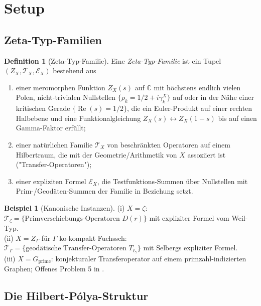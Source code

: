 \documentclass[11pt]{article}
\theoremstyle{definition}
\newtheorem{definition}[theorem]{Definition}
\newtheorem{example}[theorem]{Beispiel}
\theoremstyle{remark}
\renewcommand{\Re}{\operatorname{Re}}
\begin{document}
\section{Setup}
\label{sec:setup}

\subsection{Zeta-Typ-Familien}
\label{sec:zeta-family}

\begin{definition}[Zeta-Typ-Familie]\label{def:zeta-family}
Eine \emph{Zeta-Typ-Familie} ist ein Tupel $(Z_X, \mathcal{T}_X, \mathcal{E}_X)$
bestehend aus
\begin{enumerate}
\item einer meromorphen Funktion $Z_X(s)$ auf $\mathbb{C}$ mit höchstens
  endlich vielen Polen, nicht-trivialen Nullstellen $\{\rho_k = 1/2 + i\gamma_k^X\}$
  auf oder in der Nähe einer kritischen Gerade $\{\Re(s) = 1/2\}$, die ein Euler-Produkt
  auf einer rechten Halbebene und eine Funktionalgleichung
  $Z_X(s) \leftrightarrow Z_X(1-s)$ bis auf einen Gamma-Faktor erfüllt;
\item einer natürlichen Familie $\mathcal{T}_X$ von beschränkten Operatoren auf einem
  Hilbertraum, die mit der Geometrie/Arithmetik von $X$ assoziiert ist
  ("Transfer-Operatoren");
\item einer expliziten Formel $\mathcal{E}_X$, die Testfunktions-Summen
  über Nullstellen mit Prim-/Geodäten-Summen der Familie in Beziehung setzt.
\end{enumerate}
\end{definition}

\begin{example}[Kanonische Instanzen]\label{ex:canonical}
(i) $X = \zeta$: $\mathcal{T}_\zeta = \{\text{Primverschiebungs-Operatoren } D(r)\}$ mit expliziter Formel vom Weil-Typ.\\
(ii) $X = Z_\Gamma$ für $\Gamma$ ko-kompakt Fuchssch: $\mathcal{T}_\Gamma
= \{\text{geodätische Transfer-Operatoren } T_{\ell_\gamma}\}$ mit
Selbergs expliziter Formel.\\
(iii) $X = G_\mathrm{prime}$: konjekturaler Transferoperator auf einem
primzahl-indizierten Graphen; Offenes Problem 5 in \cite{Geiger2026RHIII}.
\end{example}

\subsection{Die Hilbert-P\'olya-Struktur}
\end{document}
